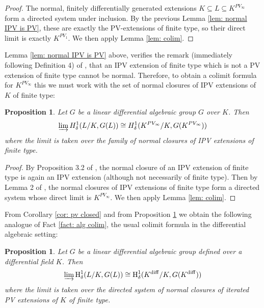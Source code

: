 \documentclass{amsart}
\newtheorem{proposition}[theorem]{Proposition}
\theoremstyle{definition}
\theoremstyle{remark}
\numberwithin{equation}{section}
\def \HH {\operatorname{H}}
\def \diff {\operatorname{diff}}
\begin{document}
\begin{proof}
    The normal, finitely differentially generated extensions $K \subseteq L\subseteq K^{PV_\infty}$ form a directed system under inclusion. By the previous Lemma \ref{lem: normal IPV is PV}, these are exactly the PV-extensions of finite type, so their direct limit is exactly $K^{PV_1}$. We then apply Lemma \ref{lem: colim}.
\end{proof}

Lemma \ref{lem: normal IPV is PV} above, verifies the remark (immediately following Definition 4) of \cite{magid2022completepicardvessiotclosure}, that an IPV extension of finite type which is not a PV extension of finite type cannot be normal. Therefore, to obtain a colimit formula for $K^{PV_{\infty}}$ this we must work with the set of normal closures of IPV extensions of $K$ of finite type:

\begin{proposition}\label{prop: colim ipv}
      Let $G$ be a linear differential algebraic group $G$ over $K$. Then $$\varinjlim H^1_{\delta}(L/K,G(L)) \cong H^1_{\delta}(K^{PV_\infty}/K,G(K^{PV_\infty}))$$ where the limit is taken over the family of normal closures of IPV extensions of finite type. 
\end{proposition}

\begin{proof}
    By Proposition 3.2 of \cite{meretzky2026galoistheoryautomorphismgroups}, the normal closure of an IPV extension of finite type is again an IPV extension (although not necessarily of finite type). Then by Lemma 2 of \cite{magid2022completepicardvessiotclosure}, the normal closures of IPV extensions of finite type form a directed system whose direct limit is $K^{PV_\infty}$. We then apply Lemma \ref{lem: colim}.
\end{proof}

From Corollary \ref{cor: pv closed} and from Proposition \ref{prop: colim ipv} we obtain the following analogue of Fact \ref{fact: alg colim}, the usual colimit formula in the differential algebraic setting:

\begin{proposition}
    Let $G$ be a linear differential algebraic group defined over a differential field $K$. Then $$\varinjlim\HH^1_{\delta}(L/K,G(L)) \cong \HH^1_{\delta}(K^{\diff}/K,G(K^{\diff}))$$ where the limit is taken over the directed system of normal closures of iterated PV extensions of $K$ of finite type.
\end{proposition}
\end{document}

